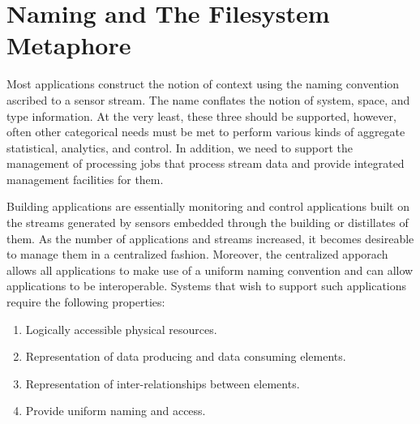 

\section{Naming and The Filesystem Metaphore}
\label{chap:naming}

Most applications
construct the notion of context using the naming convention ascribed to a sensor stream.  The name conflates the notion of system,
space, and type information.  At the very least, these three should be supported, however, often other categorical needs must be
met to perform various kinds of aggregate statistical, analytics, and control.  In addition, we need to support the management of
processing jobs that process stream data and provide integrated management facilities for them.

Building applications are essentially monitoring and control applications built on the streams generated by sensors embedded through
the building or distillates of them.  As the number of applications and streams increased, it becomes desireable to manage them 
in a centralized fashion.  Moreover, the centralized apporach allows all applications to make use of a uniform naming convention and
can allow applications to be interoperable.  Systems that wish to support such applications require the following properties:

\begin{enumerate}
\item Logically accessible physical resources.
\item Representation of data producing and data consuming elements.
\item Representation of inter-relationships between elements.
\item Provide uniform naming and access.
\end{enumerate}

 



% 
% 
% 




